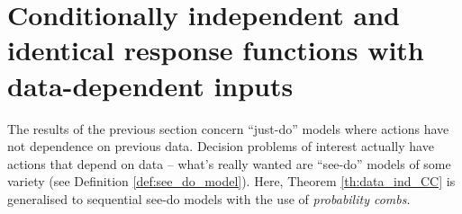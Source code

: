 

\section[Data-dependent inputs]{Conditionally independent and identical response functions with data-dependent inputs}\label{sec:data_dependent}

The results of the previous section concern ``just-do'' models where actions have not dependence on previous data. Decision problems of interest actually have actions that depend on data -- what's really wanted are ``see-do'' models of some variety (see Definition \ref{def:see_do_model}). Here, Theorem \ref{th:data_ind_CC} is generalised to sequential see-do models with the use of \emph{probability combs}.

